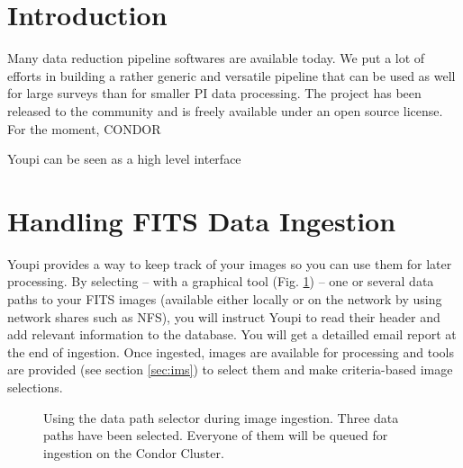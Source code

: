 \documentclass[11pt,twoside]{article}  %
\begin{document}

\section{Introduction}

Many data reduction pipeline softwares are available today. We put a lot 
of efforts in building a rather generic and versatile pipeline that can be used 
as well for large surveys than for smaller PI data processing. The project has 
been released to the community and is freely available under an open source 
license. 
For the moment, 
CONDOR

Youpi can be seen as a high level interface


\section{Handling FITS Data Ingestion}

Youpi provides a way to keep track of your images so you can use them for later 
processing. By selecting -- with a graphical tool (Fig. \ref{fig:pathsel}) -- 
one or several data paths to your FITS images (available either locally or on the 
network by using network shares such as NFS), you will instruct Youpi to read their 
header and add relevant information to the database. You will get a detailled email 
report at the end of ingestion. Once ingested, images are available for processing 
and tools are provided (see section \ref{sec:ims}) to select them and make criteria-based 
image selections.

\begin{figure}[t]
\caption{Using the data path selector during image ingestion. Three data paths have 
been selected. Everyone of them will be queued for ingestion on the Condor Cluster.}\label{fig:pathsel}
\end{figure}
\end{document}
